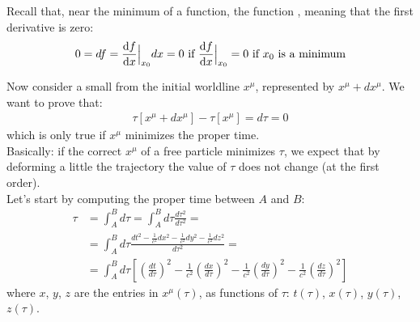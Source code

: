 \documentclass[../template.tex]{subfiles}
\begin{document}
Recall that, near the minimum of a function, the function , meaning that the first derivative is zero:
\begin{align*}
    0 = df = \dv{f}{x} \Big|_{x_0 } dx = 0 \text{ if } \dv{f}{x} \Big|_{x_0 } = 0 \text{ if } x_0 \text{ is a minimum}
\end{align*}

Now consider a small  from the initial worldline $x^\mu$, represented by $x^\mu+ dx^\mu$. We want to prove that:
\begin{align*}
    \tau[x^\mu + dx^\mu] - \tau[x^\mu] = d \tau = 0
\end{align*}
which is only true if $x^\mu$ minimizes the proper time.\\
Basically: if the correct $x^\mu$ of a free particle minimizes $\tau$, we expect that by deforming a little the trajectory the value of $\tau$ does not change (at the first order).\\

Let's start by computing the proper time between $A$ and $B$:
\begin{align*}
    \tau &= \int_{A}^{B} d \tau = \int_{A}^{B} d \tau \frac{d \tau^2}{d \tau^2} =\\
    &= \int_{A}^{B} d \tau \frac{dt^2 - \frac{1}{c^2} dx^2 - \frac{1}{c^2} dy^2 - \frac{1}{c^2} dz^2}{d \tau^2} =\\
    &= \int_{A}^{B} d \tau \left[\left(\frac{d t}{d \tau} \right)^2 -\frac{1}{c^2} \left(\frac{dx}{d \tau} \right)^2 - \frac{1}{c^2}\left(\frac{dy}{d \tau} \right)^2 -\frac{1}{c^2} \left(\frac{dz}{d \tau} \right)^2   \right]   
\end{align*}
where $x$, $y$, $z$ are the entries in $x^\mu(\tau)$, as functions of $\tau$: $t(\tau)$, $x(\tau)$, $y(\tau)$, $z(\tau)$.\\
\end{document}
